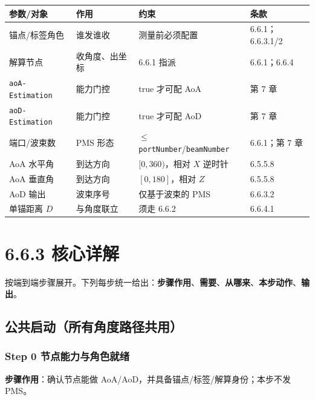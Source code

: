 \documentclass[11pt,a4paper]{ctexart}
\begin{document}
\begin{table}[h]
\centering
\small
\begin{tabular}{L{3.0cm}L{4.5cm}L{3.8cm}l}
\toprule
\textbf{参数/对象} & \textbf{作用} & \textbf{约束} & \textbf{条款} \\
\midrule
锚点/标签角色 & 谁发谁收 & 测量前必须配置 & 6.6.1；6.6.3.1/2 \\
解算节点 & 收角度、出坐标 & 6.6.1 指派 & 6.6.1；6.6.4 \\
\texttt{aoA-Estimation} & 能力门控 & true 才可配 AoA & 第 7 章 \\
\texttt{aoD-Estimation} & 能力门控 & true 才可配 AoD & 第 7 章 \\
端口/波束数 & PMS 形态 & $\le$ \texttt{portNumber}/\texttt{beamNumber} & 6.6.1；第 7 章 \\
AoA 水平角 & 到达方向 & $[0,360)$，相对 $X$ 逆时针 & 6.5.5.8 \\
AoA 垂直角 & 到达方向 & $[0,180]$，相对 $Z$ & 6.5.5.8 \\
AoD 输出 & 波束序号 & 仅基于波束的 PMS & 6.6.3.2 \\
单锚距离 $D$ & 与角度联立 & 须走 6.6.2 & 6.6.4.1 \\
\bottomrule
\end{tabular}
\end{table}

\section{6.6.3 核心详解}

按端到端步骤展开。下列每步统一给出：\textbf{步骤作用}、\textbf{需要}、\textbf{从哪来}、\textbf{本步动作}、\textbf{输出}。

\subsection{公共启动（所有角度路径共用）}
\label{sec:common}

\subsubsection{Step 0 节点能力与角色就绪}

\textbf{步骤作用}：确认节点能做 AoA/AoD，并具备锚点/标签/解算身份；本步不发 PMS。
\end{document}
